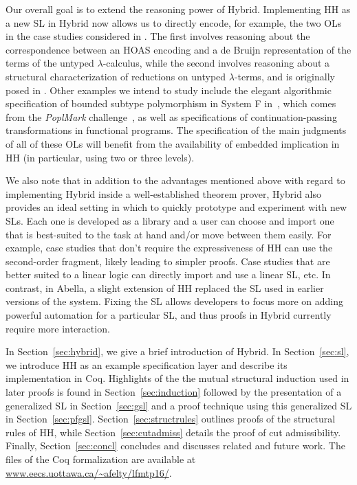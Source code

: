 Our overall goal is to extend the reasoning power of Hybrid. Implementing HH as a new SL in Hybrid now allows us to directly encode, for example, the two OLs in the case studies considered in \cite{WCGN:PPDP13}.  The first involves reasoning about the correspondence between an HOAS encoding and a de Bruijn representation of the terms of the untyped $\lambda$-calculus, while the second involves reasoning about a structural characterization of reductions on untyped $\lambda$-terms, and is originally posed in \cite{LProlog}. Other examples we intend to study include the elegant algorithmic specification of bounded subtype polymorphism in System F in~\cite{Pientka:TPHOLs07}, which comes from the \textsl{PoplMark} challenge~\cite{Aydemir05TPHOLs}, as well as specifications of continuation-passing transformations in functional programs.  The specification of the main judgments of all of these OLs will benefit from the availability of embedded implication in HH (in particular, using two or three levels).

We also note that in addition to the advantages mentioned above with regard to implementing Hybrid inside a well-established theorem prover, Hybrid also provides an ideal setting in which to quickly prototype and experiment with new SLs.  Each one is developed as a library and a user can choose and import one that is best-suited to the task at hand and/or move between them easily.  For example, case studies that don't require the expressiveness of HH can use the second-order fragment, likely leading to simpler proofs.  Case studies that are better suited to a linear logic can directly import and use a linear SL, etc.  In contrast, in Abella, a slight extension of HH replaced the SL used in earlier versions of the system.  Fixing the SL allows developers to focus more on adding powerful automation for a particular SL, and thus proofs in Hybrid currently require more interaction.

In Section~\ref{sec:hybrid}, we give a brief introduction of Hybrid. In Section~\ref{sec:sl}, we introduce HH as an example specification layer and describe its implementation in Coq. Highlights of the the mutual structural induction used in later proofs is found in Section~\ref{sec:induction} followed by the presentation of a generalized SL in Section~\ref{sec:gsl} and a proof technique using this generalized SL in Section~\ref{sec:pfgsl}. Section~\ref{sec:structrules} outlines proofs of the structural rules of HH, while Section~\ref{sec:cutadmiss} details the proof of cut admissibility. Finally, Section~\ref{sec:concl} concludes and discusses related and future work. The files of the Coq formalization are available at \url{www.eecs.uottawa.ca/~afelty/lfmtp16/}.
